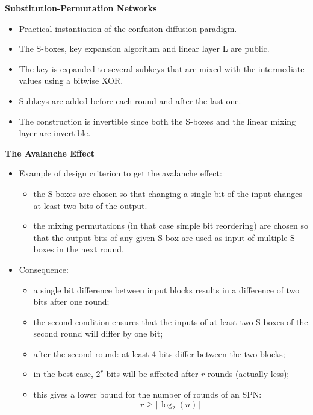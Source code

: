 \textbf{Substitution-Permutation Networks}
\begin{itemize}
    \item Practical instantiation of the confusion-diffusion paradigm.
    \item The S-boxes, key expansion algorithm and linear layer L are public.
    \item The key is expanded to several subkeys that are mixed with the intermediate values using a bitwise XOR.
    \item Subkeys are added before each round and after the last one.
    \item The construction is invertible since both the S-boxes and the linear mixing layer are invertible.\newline
\end{itemize}


\textbf{The Avalanche Effect}
\begin{itemize}
    \item Example of design criterion to get the avalanche effect:
    \begin{itemize}
        \item the S-boxes are chosen so that changing a single bit of the input changes at least two bits of the output.
        \item the mixing permutations (in that case simple bit reordering) are chosen so that the output bits of any given S-box are used as input of multiple S-boxes in the next round.
    \end{itemize}
    \item Consequence:
    \begin{itemize}
        \item a single bit difference between input blocks results in a difference of two bits after one round;
        \item the second condition ensures that the inputs of at least two S-boxes of the second round will differ by one bit;
        \item after the second round: at least 4 bits differ between the two blocks;
        \item in the best case, $2^r$ bits will be affected after $r$ rounds (actually less);
        \item this gives a lower bound for the number of rounds of an SPN: $$r \geq \lceil \log_2(n) \rceil$$\newline
    \end{itemize}
\end{itemize}


